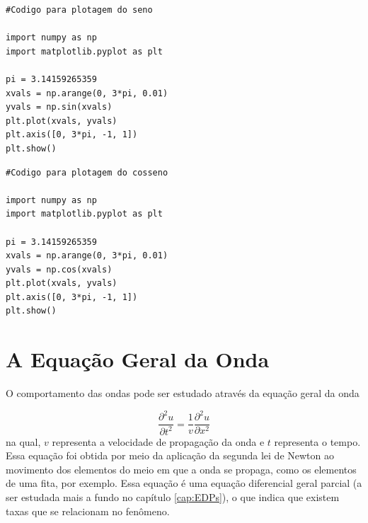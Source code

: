 		\lstset{language=Python}
		\begin{lstlisting}
#Codigo para plotagem do seno

import numpy as np
import matplotlib.pyplot as plt

pi = 3.14159265359
xvals = np.arange(0, 3*pi, 0.01)
yvals = np.sin(xvals)
plt.plot(xvals, yvals)
plt.axis([0, 3*pi, -1, 1])
plt.show()
		\end{lstlisting}
		
		\begin{lstlisting}
#Codigo para plotagem do cosseno

import numpy as np
import matplotlib.pyplot as plt

pi = 3.14159265359
xvals = np.arange(0, 3*pi, 0.01)
yvals = np.cos(xvals)
plt.plot(xvals, yvals)
plt.axis([0, 3*pi, -1, 1])
plt.show()
		\end{lstlisting}
		
	\section{A Equação Geral da Onda}
		O comportamento das ondas pode ser estudado através da equação geral da onda
		
		\begin{equation}
		    \frac{\partial^2 u}{\partial t^2} = \frac{1}{v}\frac{\partial^2 u}{\partial x^2}
		\end{equation}
		na qual, $v$ representa a velocidade de propagação da onda e $t$ representa o tempo. Essa equação foi obtida por meio da aplicação da segunda lei de Newton ao movimento dos elementos do meio em que a onda se propaga, como os elementos de uma fita, por exemplo. Essa equação é uma equação diferencial geral parcial (a ser estudada mais a fundo no capítulo \ref{cap:EDPs}), o que indica que existem taxas que se relacionam no fenômeno.
	

